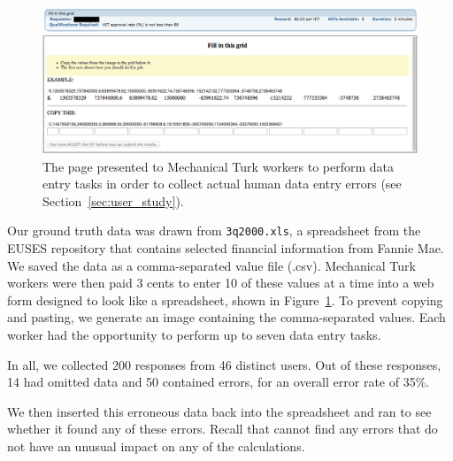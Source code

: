 \begin{figure}[!t]
\centering
\includegraphics[width=6.5in]{images/mturk_fuzz_task}
  \caption{The page presented to Mechanical Turk workers to perform data entry tasks in order to collect actual human data entry errors (see Section~\ref{sec:user_study}).\label{fig:mturk_task}}
\end{figure}



Our ground truth data was drawn from \texttt{3q2000.xls}, a
spreadsheet from the EUSES repository that contains selected financial
information from Fannie Mae. We saved the data as a comma-separated
value file (.csv). Mechanical Turk workers were then paid 3 cents to
enter 10 of these values at a time into a web form designed to look
like a spreadsheet, shown in Figure~\ref{fig:mturk_task}. To prevent
copying and pasting, we generate an image containing the
comma-separated values.  Each worker had the opportunity to perform up
to seven data entry tasks.

In all, we collected 200 responses from 46 distinct users. Out of
these responses, 14 had omitted data and 50 contained errors, for an
overall error rate of 35\%.

We then inserted this erroneous data back into the spreadsheet and
ran \checkcell{} to see whether it found any of these errors. Recall
that \checkcell{} cannot find any errors that do not have an unusual
impact on any of the calculations.
